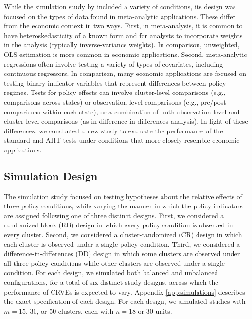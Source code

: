 \documentclass[12pt]{article}\usepackage[]{graphicx}\usepackage[]{color}
\begin{document}
While the simulation study by \citet{Tipton2015small-F} included a variety of conditions, its design was focused on the types of data found in meta-analytic applications. 
These differ from the economic context in two ways.
First, in meta-analysis, it is common to have heteroskedasticity of a known form and for analysts to incorporate weights in the analysis (typically inverse-variance weights).
In comparison, unweighted, OLS estimation is more common in economic applications.
Second, meta-analytic regressions often involve testing a variety of types of covariates, including continuous regressors.
In comparison, many economic applications are focused on testing binary indicator variables that represent differences between policy regimes. 
Tests for policy effects can involve cluster-level comparisons (e.g., comparisons across states) or observation-level comparisons (e.g., pre/post comparisons within each state), or a combination of both observation-level and cluster-level comparisons (as in difference-in-differences analysis).
In light of these differences, we conducted a new study to evaluate the performance of the standard and AHT tests under conditions that more closely resemble economic applications. 

\subsection{Simulation Design}

The simulation study focused on testing hypotheses about the relative effects of three policy conditions, while varying the manner in which the policy indicators are assigned following one of three distinct designs. 
First, we considered a randomized block (RB) design in which every policy condition is observed in every cluster. 
Second, we considered a cluster-randomized (CR) design in which each cluster is observed under a single policy condition. 
Third, we considered a difference-in-differences (DD) design in which some clusters are observed under all three policy conditions while other clusters are observed under a single condition. 
For each design, we simulated both balanced and unbalanced configurations, for a total of six distinct study designs, across which the performance of CRVEs is expected to vary. 
Appendix \ref{app:simulations} describes the exact specification of each design. For each design, we simulated studies with $m = 15$, 30, or 50 clusters, each with $n = 18$ or 30 units.
\end{document}
